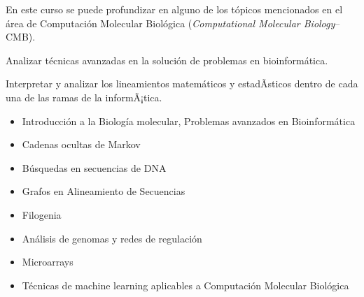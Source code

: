 \begin{syllabus}


\begin{justification}
En este curso se puede profundizar en alguno de los tópicos
mencionados en el área de Computación Molecular Biológica (\textit{Computational Molecular Biology}--CMB).\nocite{dav01,pav04,pete00}
\end{justification}

\begin{goals}
\item Analizar técnicas avanzadas en la solución de problemas en bioinformática.
\item Interpretar y analizar los lineamientos matemáticos y estadÃ­sticos dentro de cada una de las ramas de la informÃ¡tica.
\end{goals}

\begin{outcomes}
\end{outcomes}

\begin{itemize}
\item Introducción a la Biología molecular, Problemas avanzados en Bioinformática
\item Cadenas ocultas de Markov
\item Búsquedas en secuencias de DNA
\item Grafos en Alineamiento de Secuencias
\item Filogenia
\item Análisis de genomas y redes de regulación
\item Microarrays
\item Técnicas de machine learning aplicables a Computación Molecular Biológica
\end{itemize}



\begin{coursebibliography}
\end{coursebibliography}

\end{syllabus}
